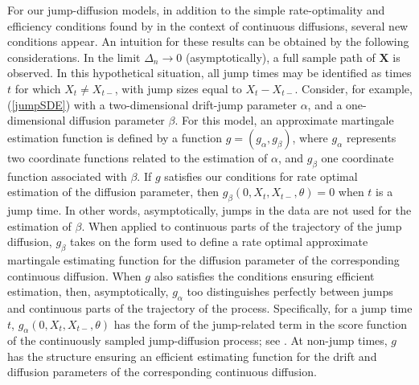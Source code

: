 \documentclass[11pt,a4paper]{article}
\newcommand{\X}{{\mathbf X}}
\numberwithin{equation}{section}
\numberwithin{theorem}{section}
\begin{document}
For our jump-diffusion models, in addition to the simple rate-optimality and efficiency conditions found by \cite{efficient} in the context of continuous diffusions, several new conditions appear. An intuition for these results can be obtained by the following considerations. In the limit $\Delta_n \to 0$ (asymptotically), a full sample path of $\X$ is observed. In this hypothetical situation, all jump times may be identified as times $t$ for which $X_t \neq X_{t-}$, with jump sizes equal to $X_t-X_{t-}$. Consider, for example, (\ref{jumpSDE}) with a two-dimensional drift-jump parameter $\alpha$, and a one-dimensional diffusion parameter $\beta$. For this model, an approximate martingale estimation function is defined by a function $g = (g_\alpha, g_\beta)$, where $g_\alpha$ represents two coordinate functions related to the estimation of $\alpha$, and $g_\beta$ one coordinate function associated with $\beta$. If $g$ satisfies our conditions for rate optimal estimation of the diffusion parameter, then $g_\beta(0,X_t,X_{t-}, \theta) = 0$ when $t$ is a jump time. In other words, asymptotically, jumps in the data are not used for the estimation of $\beta$. When applied to continuous parts of the trajectory of the jump diffusion,  $g_\beta$ takes on the form used to define a rate optimal approximate martingale estimating function for the diffusion parameter of the corresponding continuous diffusion. When $g$ also satisfies the conditions ensuring efficient estimation, then, asymptotically, $g_\alpha$ too distinguishes perfectly between jumps and continuous parts of the trajectory of the process. Specifically, for a jump time $t$, $g_\alpha(0,X_t,X_{t-}, \theta)$ has the form of the jump-related term in the score function of the continuously sampled jump-diffusion process; see \cite{soerensen1991}. At non-jump times, $g$ has the structure ensuring an efficient estimating function for the drift and diffusion parameters of the corresponding continuous diffusion. \medskip
\end{document}
